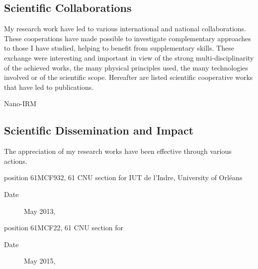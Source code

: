 \subsection{Scientific Collaborations}\label{sec:CV:coll}

My research work have led to various international and national collaborations.
These cooperations have made possible to investigate complementary approaches to those I have studied, helping to benefit from supplementary skills.
These exchange were interesting and important in view of the strong multi-disciplinarity of the achieved works, the many physical principles used, the many technologies involved or of the scientific scope.
Hereafter  are listed scientific cooperative works that have led to publications.



\begin{CVlist}[label={[COL\arabic*]}]
  \item{}\textsf{Nano-IRM}
\end{CVlist}


\subsection{Scientific Dissemination and Impact}\label{sec:CV:diffusion}

The appreciation of my research works have been effective through various actions.

\begin{CVlist}[label={[MCF\arabic*]}]  
  \item{}position 61MCF932, 61 CNU section for {IUT de l'Indre}, University of Orléans
  \begin{description}
    \item[Date] May 2013, 
  \end{description}
  \item{}position 61MCF22, 61 CNU section for {\INSA \CVL}
  \begin{description}
    \item[Date] May 2015,
  \end{description}
\end{CVlist}

